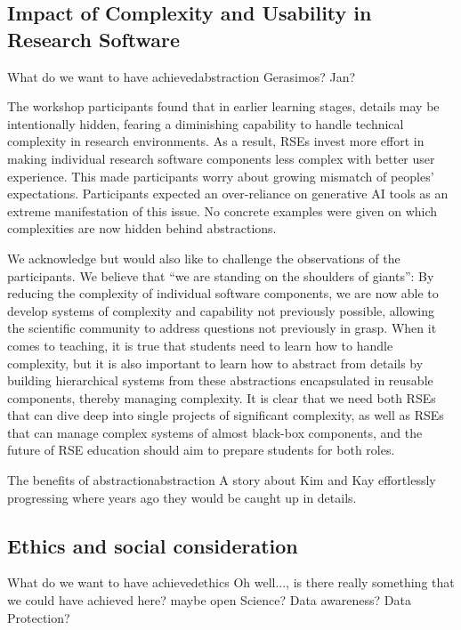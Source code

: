 \documentclass{eceasst}
\begin{document}
\subsection{Impact of Complexity and Usability in Research Software}
\begin{whatis}{What do we want to have achieved}{abstraction}
Gerasimos? Jan?
\end{whatis}

The workshop participants found that in earlier learning stages,
details may be intentionally hidden,
fearing a diminishing capability to handle technical complexity in research environments.
As a result, RSEs invest more effort in making individual research software components
less complex with better user experience.
This made participants worry about growing mismatch of peoples' expectations.
Participants expected an over-reliance on generative AI tools as an extreme manifestation of this issue.
No concrete examples were given on which complexities are now hidden behind abstractions.

We acknowledge but would also like to challenge the observations of the participants.
We believe that ``we are standing on the shoulders of giants'':
By reducing the complexity of individual software components,
we are now able to develop systems of complexity and capability not previously possible,
allowing the scientific community to address questions not previously in grasp.
When it comes to teaching, it is true that students need to learn how to handle complexity,
but it is also important to learn how to abstract from details
by building hierarchical systems from these abstractions encapsulated in reusable components, thereby managing complexity.
It is clear that we need both RSEs that can dive deep into single projects of significant complexity,
as well as RSEs that can manage complex systems of almost black-box components,
and the future of RSE education should aim to prepare students for both roles.

\begin{story}{The benefits of abstraction}{abstraction}
A story about Kim and Kay effortlessly progressing where years ago they would be caught up in details.
\end{story}

\subsection{Ethics and social consideration}
\begin{whatis}{What do we want to have achieved}{ethics}
Oh well..., is there really something that we could have achieved here?
maybe open Science? Data awareness? Data Protection?
\end{whatis}
\end{document}
